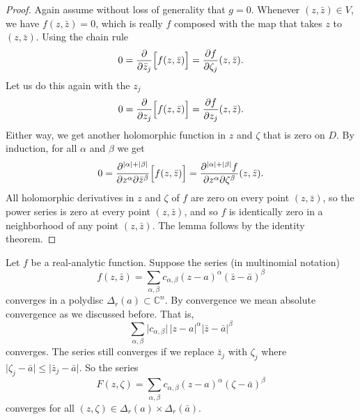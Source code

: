 \documentclass[12pt,openany]{book}
\newcommand{\sabs}[1]{\lvert {#1} \rvert}
\newcommand{\C}{{\mathbb{C}}}
\theoremstyle{plain}
\theoremstyle{remark}
\theoremstyle{definition}
\theoremstyle{exercise}
\theoremstyle{example}
\begin{document}
\begin{proof}
Again assume without loss of generality that $g=0$.
Whenever $(z,\bar{z}) \in V$, we have $f(z,\bar{z}) = 0$, which is really
$f$ composed with the map that takes $z$ to $(z,\bar{z})$.  Using the chain rule
\begin{equation*}
0 =
\frac{\partial}{\partial \bar{z}_j} \Bigl[f(z,\bar{z})\Bigr]
=
\frac{\partial f}{\partial \zeta_j}(z,\bar{z}) .
\end{equation*}
Let us do this again with the $z_j$
\begin{equation*}
0 =
\frac{\partial}{\partial z_j} \Bigl[f(z,\bar{z})\Bigr]
=
\frac{\partial f}{\partial z_j}(z,\bar{z}) .
\end{equation*}
Either way, we get another holomorphic function in $z$ and $\zeta$
that is zero on $D$.
By induction, for all $\alpha$ and $\beta$ we get
\begin{equation*}
0 =
\frac{\partial^{\sabs{\alpha}+\sabs{\beta}}}{\partial z^\alpha \partial \bar{z}^\beta} \Bigl[f(z,\bar{z})\Bigr]
=
\frac{\partial^{\sabs{\alpha}+\sabs{\beta}} f}{\partial z^\alpha \partial
\zeta^\beta}(z,\bar{z}) .
\end{equation*}
All holomorphic derivatives in $z$ and $\zeta$ of $f$ are zero on every point
$(z,\bar{z})$, so the power series is zero at every point $(z,\bar{z})$,
and so $f$ is identically zero in a neighborhood of any
point $(z,\bar{z})$.  The lemma follows by the identity
theorem.
\end{proof}

Let $f$ be a real-analytic function.  Suppose 
the series (in multinomial notation)
\begin{equation*}
f(z,\bar{z}) =
\sum_{\alpha,\beta} c_{\alpha,\beta} {(z-a)}^\alpha
{(\bar{z}-\bar{a})}^\beta
\end{equation*}
converges in a polydisc $\Delta_r(a) \subset \C^n$.
By convergence we mean absolute
convergence as we discussed before.  That is,
\begin{equation*}
\sum_{\alpha,\beta} \sabs{c_{\alpha,\beta}} \, \sabs{z-a}^\alpha
\sabs{\bar{z}-\bar{a}}^\beta
\end{equation*}
converges.
The series still converges if we replace $\bar{z}_j$  with
$\zeta_j$ where $\sabs{\zeta_j-\bar{a}} \leq \sabs{\bar{z}_j-\bar{a}}$.
So the series
\begin{equation*}
F(z,\zeta) =
\sum_{\alpha,\beta} c_{\alpha,\beta} {(z-a)}^\alpha
{(\zeta-\bar{a})}^\beta
\end{equation*}
converges for all $(z,\zeta) \in \Delta_r(a) \times \Delta_r(\bar{a})$.
\end{document}
